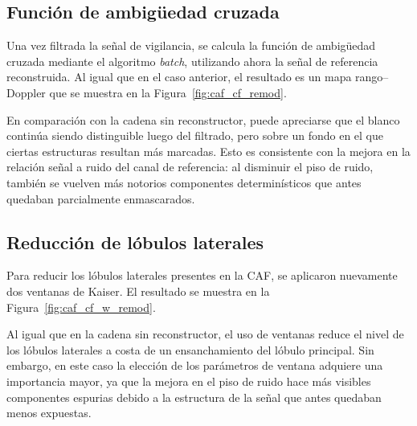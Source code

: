 \subsection{Función de ambigüedad cruzada}



Una vez filtrada la señal de vigilancia, se calcula la función de ambigüedad cruzada mediante el algoritmo \textit{batch}, utilizando ahora la señal de referencia reconstruida. Al igual que en el caso anterior, el resultado es un mapa rango--Doppler que se muestra en la Figura~\ref{fig:caf_cf_remod}.







En comparación con la cadena sin reconstructor, puede apreciarse que el blanco continúa siendo distinguible luego del filtrado, pero sobre un fondo en el que ciertas estructuras resultan más marcadas. Esto es consistente con la mejora en la relación señal a ruido del canal de referencia: al disminuir el piso de ruido, también se vuelven más notorios componentes determinísticos que antes quedaban parcialmente enmascarados.



\subsection{Reducción de lóbulos laterales}



Para reducir los lóbulos laterales presentes en la CAF, se aplicaron nuevamente dos ventanas de Kaiser. El resultado se muestra en la Figura~\ref{fig:caf_cf_w_remod}.







Al igual que en la cadena sin reconstructor, el uso de ventanas reduce el nivel de los lóbulos laterales a costa de un ensanchamiento del lóbulo principal. Sin embargo, en este caso la elección de los parámetros de ventana adquiere una importancia mayor, ya que la mejora en el piso de ruido hace más visibles componentes espurias debido a la estructura de la señal que antes quedaban menos expuestas.




